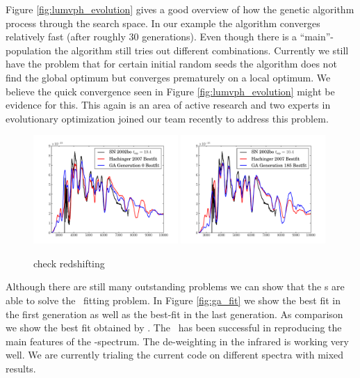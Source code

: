 Figure \ref{fig:lumvph_evolution} gives a good overview of how the genetic algorithm process through the search space. In our example the algorithm converges relatively fast (after roughly 30 generations). Even though there is a ``main''-population the algorithm still tries out different combinations. Currently we still have the problem that for certain initial random seeds the algorithm does not find the global optimum but converges prematurely on a local optimum. We believe the quick convergence seen in Figure \ref{fig:lumvph_evolution} might be evidence for this. This again is an area of active research and two experts in evolutionary optimization joined our team recently to address this problem. 

\begin{figure}[htbp] %
   \centering
   \includegraphics[width=0.49\textwidth]{chapter_dalek/plots/plot_ga0_speccompare.pdf} 
   \includegraphics[width=0.49\textwidth]{chapter_dalek/plots/plot_ga185_speccompare.pdf} 
   \caption{check redshifting}
   \label{fig:example}
\end{figure}

Although there are still many outstanding problems we can show that the \ga s are able to solve the \sneia\ fitting problem. In Figure \ref{fig:ga_fit} we show the best fit in the first generation as well as the best-fit in the last generation. As comparison we show the best fit obtained by \citet{hachinger_dipl2007}. The \ga\ has been successful in reproducing the main features of the \sneia-spectrum. The de-weighting in the infrared is working very well. We are currently trialing the current code on different spectra with mixed results. 


